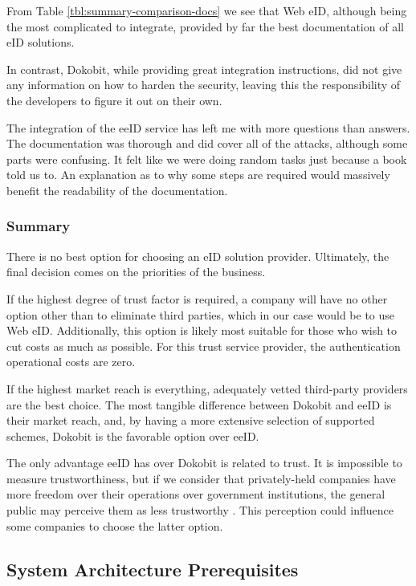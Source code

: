 From Table \ref{tbl:summary-comparison-docs} we see that Web eID, although being the most complicated to integrate, provided by far the best documentation of all eID solutions.

In contrast, Dokobit, while providing great integration instructions, did not give any information on how to harden the security, leaving this the responsibility of the developers to figure it out on their own.

The integration of the eeID service has left me with more questions than answers. The documentation was thorough and did cover all of the attacks, although some parts were confusing. It felt like we were doing random tasks just because a book told us to. An explanation as to why some steps are required would massively benefit the readability of the documentation.

\subsubsection{Summary}

There is no best option for choosing an eID solution provider. Ultimately, the final decision comes on the priorities of the business.

If the highest degree of trust factor is required, a company will have no other option other than to eliminate third parties, which in our case would be to use Web eID. Additionally, this option is likely most suitable for those who wish to cut costs as much as possible. For this trust service provider, the authentication operational costs are zero.

If the highest market reach is everything, adequately vetted third-party providers are the best choice. The most tangible difference between Dokobit and eeID is their market reach, and, by having a more extensive selection of supported schemes, Dokobit is the favorable option over eeID.

The only advantage eeID has over Dokobit is related to trust. It is impossible to measure trustworthiness, but if we consider that privately-held companies have more freedom over their operations over government institutions, the general public may perceive them as less trustworthy \cite{ha2004factors}. This perception could influence some companies to choose the latter option.

\subsection{System Architecture Prerequisites}

